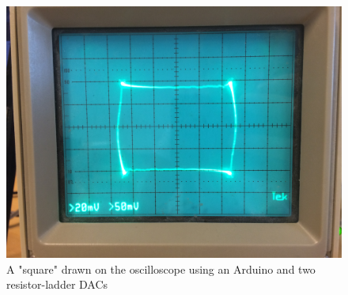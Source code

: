 \begin{figure}[h]
\includegraphics[width=\columnwidth]{images/osc_square_close}
\centering
\caption{A "square" drawn on the oscilloscope using an Arduino and two resistor-ladder DACs}
\label{fig:osc_poc}
\end{figure}